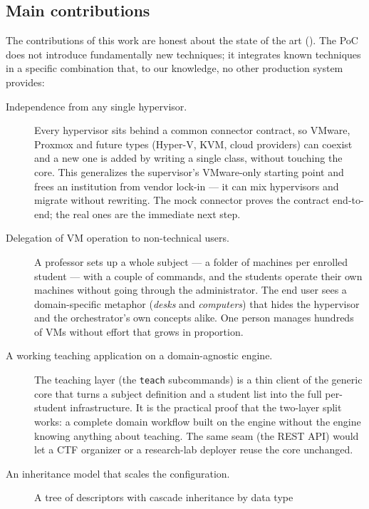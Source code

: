 \subsection{Main contributions}

The contributions of this work are honest about the state of the
art (). The PoC does not introduce
fundamentally new techniques; it integrates known techniques in a
specific combination that, to our knowledge, no other production
system provides:

\begin{description}
  \item[Independence from any single hypervisor.]
        Every hypervisor sits behind a common connector contract, so
        VMware, Proxmox and future types (Hyper-V, KVM, cloud
        providers) can coexist and a new one is added by writing a
        single class, without touching the core. This generalizes the
        supervisor's VMware-only starting point and frees an
        institution from vendor lock-in --- it can mix hypervisors and
        migrate without rewriting. The mock connector proves the
        contract end-to-end; the real ones are the immediate next
        step.
  \item[Delegation of VM operation to non-technical users.]
        A professor sets up a whole subject --- a folder of machines
        per enrolled student --- with a couple of commands, and the
        students operate their own machines without going through the
        administrator. The end user sees a domain-specific metaphor
        (\emph{desks} and \emph{computers}) that hides the hypervisor
        and the orchestrator's own concepts alike. One person manages
        hundreds of VMs without effort that grows in proportion.
  \item[A working teaching application on a domain-agnostic engine.]
        The teaching layer (the \texttt{teach} subcommands) is a thin
        client of the generic core that turns a subject definition and
        a student list into the full per-student infrastructure. It is
        the practical proof that the two-layer split works: a complete
        domain workflow built on the engine without the engine knowing
        anything about teaching. The same seam (the REST API) would let
        a CTF organizer or a research-lab deployer reuse the core
        unchanged.
  \item[An inheritance model that scales the configuration.]
        A tree of descriptors with cascade inheritance by data type

\end{description}
